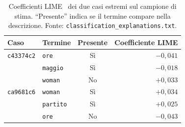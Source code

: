 \begin{table}[!htbp]
    \centering
    \small
    \caption{Coefficienti LIME~\cite{ribeiro2016whyitrustyou} dei due casi estremi sul campione di stima. ``Presente'' indica se il termine compare nella descrizione. Fonte: \texttt{classification\_explanations.txt}.}
    \label{tab:risultati-lime}
    \begin{tabular}{@{}llcr@{}}
        \toprule
        Caso & Termine & Presente & Coefficiente LIME \\
        \midrule
        \texttt{c43374c2} & \texttt{ore} & Sì & $-0{,}041$ \\
                           & \texttt{maggio} & Sì & $-0{,}018$ \\
                           & \texttt{woman} & No & $+0{,}033$ \\
        \addlinespace
        \texttt{ca9681c6} & \texttt{woman} & Sì & $+0{,}034$ \\
                           & \texttt{partito} & Sì & $+0{,}025$ \\
                           & \texttt{ore} & No & $-0{,}043$ \\
        \bottomrule
    \end{tabular}
\end{table}

